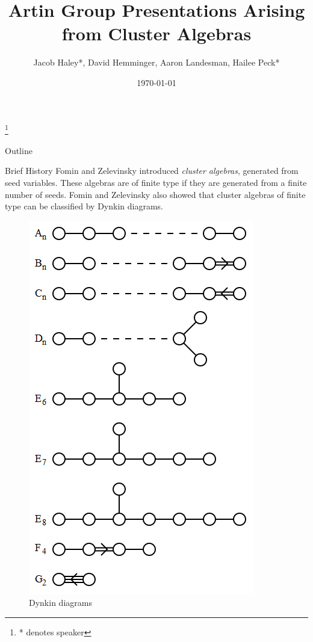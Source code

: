 \documentclass{beamer}
\title[Artin Group Presentations]{Artin Group Presentations Arising from Cluster Algebras}
\author{Jacob Haley*, David Hemminger, Aaron Landesman, 
Hailee Peck*}
\institute{University of Minnesota, Twin Cities REU}
\date{\today}
\begin{document}
\begin{frame}
  \titlepage
  \let\thefootnote\relax\footnote{* denotes speaker}
\end{frame}

 
\begin{frame}{Outline}
  \tableofcontents
\end{frame}

\begin{frame}{Brief History}
Fomin and Zelevinsky introduced \textit{cluster algebras}, generated from seed variables. These algebras are of finite type if they are generated from a finite number of seeds. Fomin and Zelevinsky also showed that cluster algebras of finite type can be classified by Dynkin diagrams.
\begin{figure}
\centering
\includegraphics[scale = .25]{dynkindiagrams.PNG}
\caption{Dynkin diagrams}
\end{figure}
\end{frame}
\end{document}
